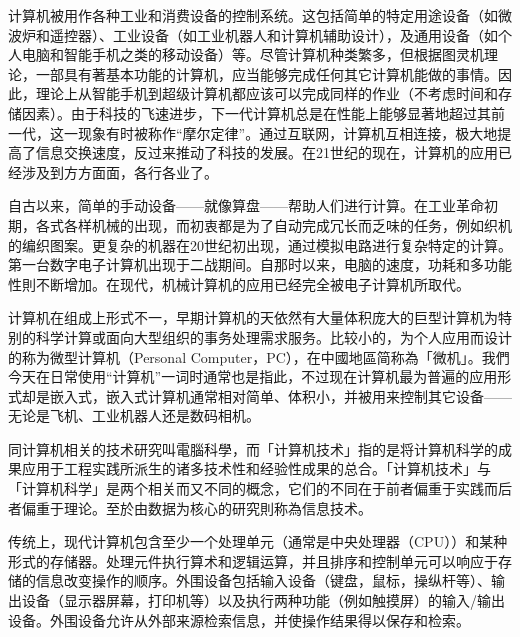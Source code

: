 \documentclass[twoside,a4paper,12pt]{book}%
\begin{document}
{计算机被用作各种工业和消费设备的控制系统。这包括简单的特定用途设备（如微波炉和遥控器）、工业设备（如工业机器人和计算机辅助设计），及通用设备（如个人电脑和智能手机之类的移动设备）等。尽管计算机种类繁多，但根据图灵机理论，一部具有著基本功能的计算机，应当能够完成任何其它计算机能做的事情。因此，理论上从智能手机到超级计算机都应该可以完成同样的作业（不考虑时间和存储因素）。由于科技的飞速进步，下一代计算机总是在性能上能够显著地超过其前一代，这一现象有时被称作“摩尔定律”。通过互联网，计算机互相连接，极大地提高了信息交换速度，反过来推动了科技的发展。在21世纪的现在，计算机的应用已经涉及到方方面面，各行各业了。

自古以来，简单的手动设备——就像算盘——帮助人们进行计算。在工业革命初期，各式各样机械的出现，而初衷都是为了自动完成冗长而乏味的任务，例如织机的编织图案。更复杂的机器在20世纪初出现，通过模拟电路进行复杂特定的计算。第一台数字电子计算机出现于二战期间。自那时以来，电脑的速度，功耗和多功能性則不断增加。在现代，机械计算机的应用已经完全被电子计算机所取代。

计算机在组成上形式不一，早期计算机的天依然有大量体积庞大的巨型计算机为特别的科学计算或面向大型组织的事务处理需求服务。比较小的，为个人应用而设计的称为微型计算机（Personal Computer，PC），在中國地區简称為「微机」。我們今天在日常使用“计算机”一词时通常也是指此，不过现在计算机最为普遍的应用形式却是嵌入式，嵌入式计算机通常相对简单、体积小，并被用来控制其它设备——无论是飞机、工业机器人还是数码相机。

同计算机相关的技术研究叫電腦科學，而「计算机技术」指的是将计算机科学的成果应用于工程实践所派生的诸多技术性和经验性成果的总合。「计算机技术」与「计算机科学」是两个相关而又不同的概念，它们的不同在于前者偏重于实践而后者偏重于理论。至於由数据为核心的研究則称為信息技术。

传统上，现代计算机包含至少一个处理单元（通常是中央处理器（CPU））和某种形式的存储器。处理元件执行算术和逻辑运算，并且排序和控制单元可以响应于存储的信息改变操作的顺序。外围设备包括输入设备（键盘，鼠标，操纵杆等）、输出设备（显示器屏幕，打印机等）以及执行两种功能（例如触摸屏）的输入/输出设备。外围设备允许从外部来源检索信息，并使操作结果得以保存和检索。
}

\end{document}
